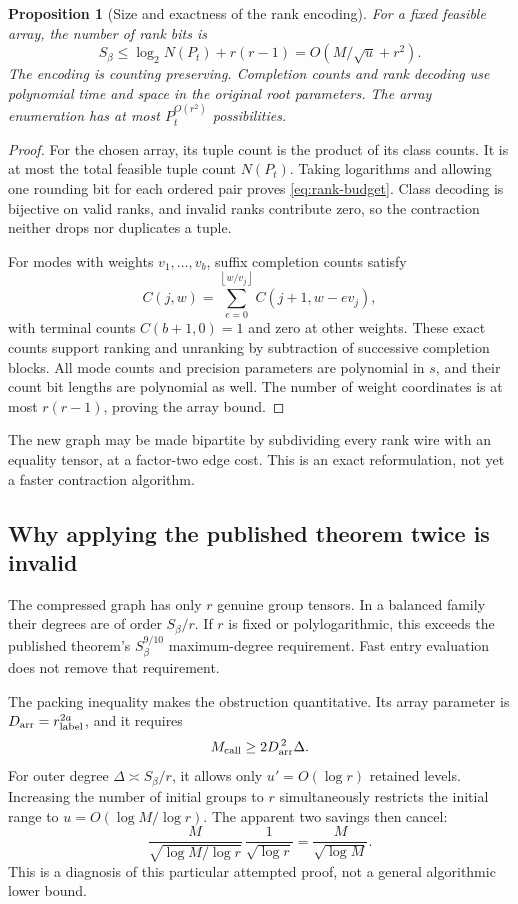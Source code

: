 \documentclass[11pt,letterpaper]{article}
\numberwithin{equation}{section}
\newtheorem{proposition}[theorem]{Proposition}
\theoremstyle{definition}
\theoremstyle{remark}
\newcommand{\floor}[1]{\left\lfloor #1\right\rfloor}
\begin{document}
\begin{proposition}[Size and exactness of the rank encoding]
\label{prop:rank}
For a fixed feasible array, the number of rank bits is
\begin{equation}
 S_\beta\le \log_2 N(P_t)+r(r-1)=O(M/\sqrt u+r^2).
 \label{eq:rank-budget}
\end{equation}
The encoding is counting preserving. Completion counts and rank decoding
use polynomial time and space in the original root parameters. The array
enumeration has at most $P_t^{O(r^2)}$ possibilities.
\end{proposition}
\begin{proof}
For the chosen array, its tuple count is the product of its class counts.
It is at most the total feasible tuple count $N(P_t)$. Taking logarithms
and allowing one rounding bit for each ordered pair proves
\eqref{eq:rank-budget}. Class decoding is bijective on valid ranks, and
invalid ranks contribute zero, so the contraction neither drops nor
duplicates a tuple.

For modes with weights $v_1,\ldots,v_b$, suffix completion counts satisfy
\[
 C(j,w)=\sum_{e=0}^{\floor{w/v_j}}C(j+1,w-ev_j),
\]
with terminal counts $C(b+1,0)=1$ and zero at other weights. These exact
counts support ranking and unranking by subtraction of successive
completion blocks. All mode counts and precision parameters are polynomial
in $s$, and their count bit lengths are polynomial as well. The number of
weight coordinates is at most $r(r-1)$, proving the array bound.
\end{proof}

The new graph may be made bipartite by subdividing every rank wire with
an equality tensor, at a factor-two edge cost. This is an exact
reformulation, not yet a faster contraction algorithm.

\subsection{Why applying the published theorem twice is invalid}

The compressed graph has only $r$ genuine group tensors. In a balanced
family their degrees are of order $S_\beta/r$. If $r$ is fixed or
polylogarithmic, this exceeds the published theorem's
$S_\beta^{9/10}$ maximum-degree requirement. Fast entry evaluation does
not remove that requirement.

The packing inequality makes the obstruction quantitative. Its array
parameter is $D_{\rm arr}=r_{\rm label}^{2a}$, and it requires
\[
 M_{\rm call}\ge2D_{\rm arr}^{\,2}\Delta.
\]
For outer degree $\Delta\asymp S_\beta/r$, it allows only
$u'=O(\log r)$ retained levels. Increasing the number of initial groups
to $r$ simultaneously restricts the initial range to
$u=O(\log M/\log r)$. The apparent two savings then cancel:
\[
 \frac{M}{\sqrt{\log M/\log r}}\,
       \frac1{\sqrt{\log r}}
   =\frac{M}{\sqrt{\log M}}.
\]
This is a diagnosis of this particular attempted proof, not a general
algorithmic lower bound.
\end{document}
